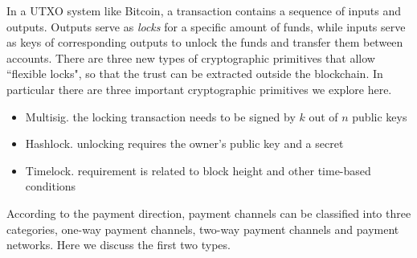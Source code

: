 \documentclass{article}
\newcommand{\pramod}[1]{{\color{red}
\footnotesize[Pramod: #1] }}
\begin{document}
In a UTXO system like Bitcoin, a transaction contains a sequence of inputs and outputs. Outputs serve as {\em locks} for a specific amount of funds, while inputs serve as keys of corresponding outputs to unlock the funds and transfer them between accounts. There are three new types of cryptographic primitives that allow ``flexible locks", so that the trust can be extracted outside the blockchain. In particular there are three important cryptographic primitives we explore here.
\begin{itemize}
    \item {\sf Multisig}. the locking transaction needs to be signed by $k$ out of $n$ public keys
    \item {\sf Hashlock}. unlocking requires the owner's public key and a secret
    \item {\sf Timelock}. requirement is related to block height and other time-based conditions
\end{itemize}



According to the payment direction,  payment channels can be classified into three categories, one-way payment channels, two-way payment channels and payment networks. Here we discuss the first two types. %
\end{document}
